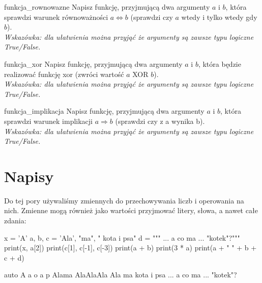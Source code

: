 \documentclass{pdfBooklets}
\begin{document}
\begin{Zadanie}{}{funkcja_rownowazne}
Napisz funkcję, przyjmującą dwa argumenty $a$ i $b$, która sprawdzi warunek równoważności $a \Leftrightarrow b$ (sprawdzi czy $a$ wtedy i tylko wtedy gdy $b$).
\\\emph{Wskazówka: dla ułatwienia można przyjąć że argumenty są zawsze typu logiczne True/False.}
\end{Zadanie}

\begin{Zadanie}{}{funkcja_xor}
Napisz funkcję, przyjmującą dwa argumenty $a$ i $b$, która będzie realizować funkcję xor (zwróci wartość $a$ XOR $b$).
\\\emph{Wskazówka: dla ułatwienia można przyjąć że argumenty są zawsze typu logiczne True/False.}
\end{Zadanie}

\begin{Zadanie}{}{funkcja_implikacja}
Napisz funkcję, przyjmującą dwa argumenty $a$ i $b$, która sprawdzi warunek implikacji $a \Rightarrow b$ (sprawdzi czy z a wynika b).
\\\emph{Wskazówka: dla ułatwienia można przyjąć że argumenty są zawsze typu logiczne True/False.}
\end{Zadanie}


\student{\clearpage}
\section{Napisy}
Do tej pory używaliśmy zmiennych do przechowywania liczb i operowania na nich. Zmienne mogą również jako wartości przyjmować litery, słowa, a nawet całe zdania:

\begin{CodeFrame}[python]{.5\textwidth}
x = 'A'
a, b, c = 'Ala', "ma", " kota i psa"
d = """ ... a co ma ...
 "kotek"?"""
print(x, a[2])
print(c[1], c[-1], c[-3])
print(a + b)
print(3 * a)
print(a + " " + b + c + d)
\end{CodeFrame}
\begin{CodeFrame}{auto}
A a
o a p
Alama
AlaAlaAla
Ala ma kota i psa ... a co ma ...
 "kotek"?
\end{CodeFrame}
\end{document}
